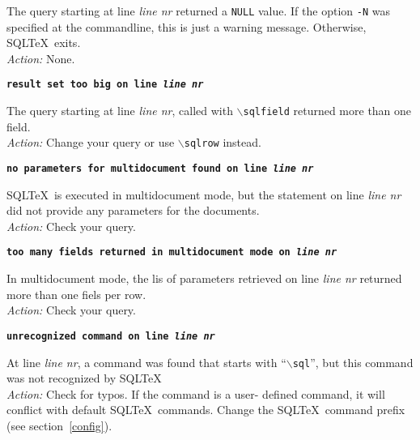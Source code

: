 \documentclass{article}
\newcommand{\bs}{\ensuremath{\backslash}}
\newcommand{\vs}{\vspace{3mm}}
\begin{document}
\noindent The query starting at line \textit{line nr} returned a \texttt{NULL} value. If the
option \texttt{-N} was specified at the commandline, this is just a warning message.
Otherwise, SQL\TeX\ exits. \\
\textit{Action:} None.

\vs

\noindent\textbf{\texttt{result set too big on line \textit{line nr}}}

\vspace{1mm}

\noindent The query starting at line \textit{line nr}, called with \texttt{\bs sqlfield} returned more than one field. \\
\textit{Action:} Change your query or use \texttt{\bs sqlrow} instead.

\vs

\noindent\textbf{\texttt{no parameters for multidocument found on line \textit{line nr}}}

\vspace{1mm}

\noindent SQL\TeX\ is executed in multidocument mode, but the statement on line
\textit{line nr} did not provide any parameters for the documents. \\
\textit{Action:} Check your query.

\vs

\noindent\textbf{\texttt{too many fields returned in multidocument mode on \textit{line nr}}}

\vspace{1mm}

\noindent In multidocument mode, the lis of parameters retrieved on line
\textit{line nr} returned more than one fiels per row. \\
\textit{Action:} Check your query.

\vs

\noindent\textbf{\texttt{unrecognized command on line \textit{line nr}}}

\vspace{1mm}

\noindent At line \textit{line nr}, a command was found that starts with ``\texttt{\bs sql}'',
but this command was not recognized by SQL\TeX\. \\
\textit{Action:} Check for typos. If the command is a user- defined command, it will
conflict with default SQL\TeX\ commands. Change the SQL\TeX\ command prefix (see section~\ref{config}).

\vs
\end{document}
